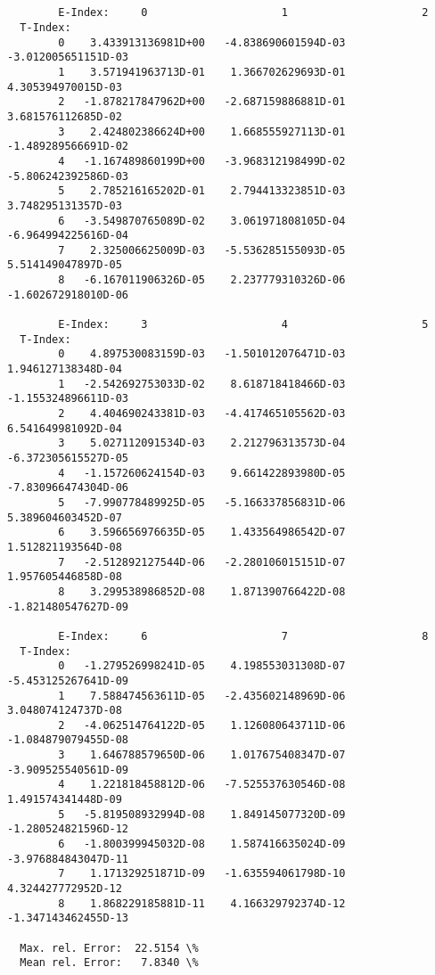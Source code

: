 \documentclass[12pt,dvipdfmx]{article}
\begin{document}
{\begin{small}\begin{verbatim}


        E-Index:     0                     1                     2
  T-Index:
        0    3.433913136981D+00   -4.838690601594D-03   -3.012005651151D-03
        1    3.571941963713D-01    1.366702629693D-01    4.305394970015D-03
        2   -1.878217847962D+00   -2.687159886881D-01    3.681576112685D-02
        3    2.424802386624D+00    1.668555927113D-01   -1.489289566691D-02
        4   -1.167489860199D+00   -3.968312198499D-02   -5.806242392586D-03
        5    2.785216165202D-01    2.794413323851D-03    3.748295131357D-03
        6   -3.549870765089D-02    3.061971808105D-04   -6.964994225616D-04
        7    2.325006625009D-03   -5.536285155093D-05    5.514149047897D-05
        8   -6.167011906326D-05    2.237779310326D-06   -1.602672918010D-06

        E-Index:     3                     4                     5
  T-Index:
        0    4.897530083159D-03   -1.501012076471D-03    1.946127138348D-04
        1   -2.542692753033D-02    8.618718418466D-03   -1.155324896611D-03
        2    4.404690243381D-03   -4.417465105562D-03    6.541649981092D-04
        3    5.027112091534D-03    2.212796313573D-04   -6.372305615527D-05
        4   -1.157260624154D-03    9.661422893980D-05   -7.830966474304D-06
        5   -7.990778489925D-05   -5.166337856831D-06    5.389604603452D-07
        6    3.596656976635D-05    1.433564986542D-07    1.512821193564D-08
        7   -2.512892127544D-06   -2.280106015151D-07    1.957605446858D-08
        8    3.299538986852D-08    1.871390766422D-08   -1.821480547627D-09

        E-Index:     6                     7                     8
  T-Index:
        0   -1.279526998241D-05    4.198553031308D-07   -5.453125267641D-09
        1    7.588474563611D-05   -2.435602148969D-06    3.048074124737D-08
        2   -4.062514764122D-05    1.126080643711D-06   -1.084879079455D-08
        3    1.646788579650D-06    1.017675408347D-07   -3.909525540561D-09
        4    1.221818458812D-06   -7.525537630546D-08    1.491574341448D-09
        5   -5.819508932994D-08    1.849145077320D-09   -1.280524821596D-12
        6   -1.800399945032D-08    1.587416635024D-09   -3.976884843047D-11
        7    1.171329251871D-09   -1.635594061798D-10    4.324427772952D-12
        8    1.868229185881D-11    4.166329792374D-12   -1.347143462455D-13

  Max. rel. Error:  22.5154 \%
  Mean rel. Error:   7.8340 \%


\end{verbatim}
\end{small}}
\end{document}

